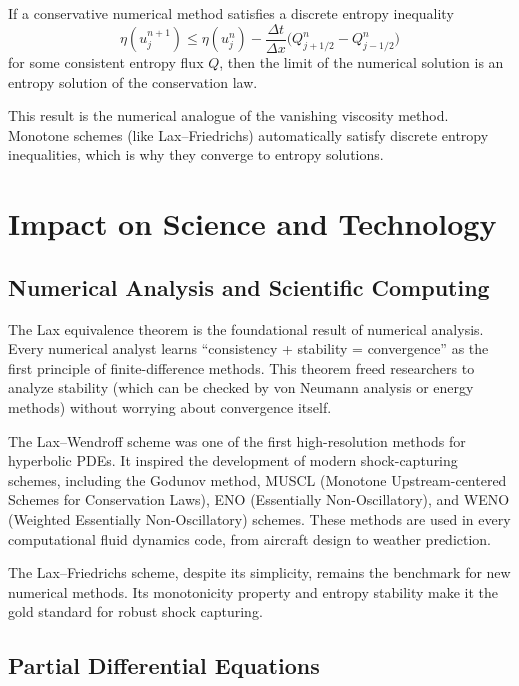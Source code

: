 \begin{theorem}
If a conservative numerical method satisfies a discrete entropy inequality
\[
\eta(u_j^{n+1}) \leq \eta(u_j^n) - \frac{\Delta t}{\Delta x} \bigl(Q_{j+1/2}^n - Q_{j-1/2}^n\bigr)
\]
for some consistent entropy flux \(Q\), then the limit of the numerical solution is an entropy solution of the conservation law.
\end{theorem}

This result is the numerical analogue of the vanishing viscosity method. Monotone schemes (like Lax--Friedrichs) automatically satisfy discrete entropy inequalities, which is why they converge to entropy solutions.

\section{Impact on Science and Technology}

\subsection{Numerical Analysis and Scientific Computing}

The Lax equivalence theorem is the foundational result of numerical analysis. Every numerical analyst learns ``consistency + stability = convergence'' as the first principle of finite-difference methods. This theorem freed researchers to analyze stability (which can be checked by von Neumann analysis or energy methods) without worrying about convergence itself.

The Lax--Wendroff scheme was one of the first high-resolution methods for hyperbolic PDEs. It inspired the development of modern shock-capturing schemes, including the Godunov method, MUSCL (Monotone Upstream-centered Schemes for Conservation Laws), ENO (Essentially Non-Oscillatory), and WENO (Weighted Essentially Non-Oscillatory) schemes. These methods are used in every computational fluid dynamics code, from aircraft design to weather prediction.

The Lax--Friedrichs scheme, despite its simplicity, remains the benchmark for new numerical methods. Its monotonicity property and entropy stability make it the gold standard for robust shock capturing.

\subsection{Partial Differential Equations}

